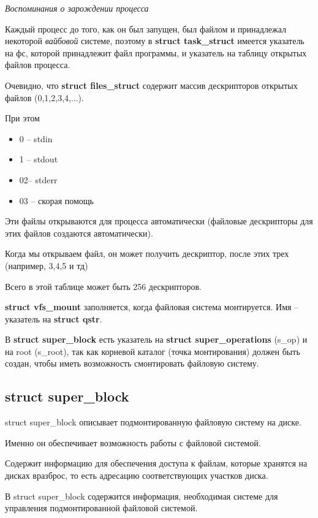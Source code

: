 \textit{Воспоминания о зарождении процесса}

\par Каждый процесс до того, как он был запущен, был файлом и принадлежал некоторой \textit{вайбовой} системе, поэтому в \textbf{struct task\_struct} имеется указатель на фс, которой принадлежит файл программы, и указатель на таблицу открытых файлов процесса.
\par Очевидно, что \textbf{struct files\_struct} содержит массив дескрипторов открытых файлов (0,1,2,3,4,...).
\par При этом 
\begin{itemize}
\item 0 -- stdin
\item 1 -- stdout
\item 02-- stderr
\item 03 -- скорая помощь
\end{itemize}
\par Эти файлы открываются для процесса автоматически (файловые дескрипторы для этих файлов создаются автоматически).
\par Когда мы открываем файл, он может получить дескриптор, после этих трех (например, 3,4,5 и тд)
\par Всего в этой таблице может быть 256 дескрипторов.
\par \textbf{struct vfs\_mount} заполняется, когда файловая система монтируется. Имя -- указатель на \textbf{struct qstr}.
\par В \textbf{struct super\_block} есть указатель на \textbf{struct super\_operations} (s\_op) и на root (s\_root), так как корневой каталог (точка монтирования) должен быть создан, чтобы иметь возможность смонтировать файловую систему.

\subsection{struct super\_block}

struct super\_block описывает подмонтированную файловую систему на диске.

Именно он обеспечивает возможность работы с файловой системой.

Содержит информацию для обеспечения доступа к файлам, которые хранятся на дисках вразброс, то есть адресацию соответствующих участков диска.

В struct super\_block содержится информация, необходимая системе для управления подмонтированной файловой системой.

